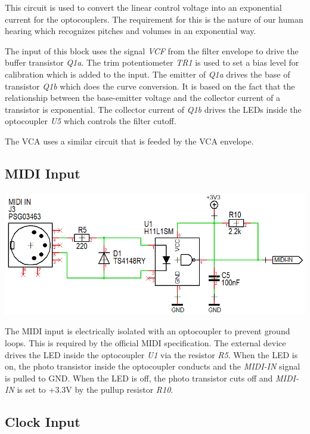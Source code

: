 \documentclass{scrartcl}
\begin{document}
This circuit is used to convert the linear control voltage into an exponential current for the optocouplers. The requirement for this is the nature of our human hearing which recognizes pitches and volumes in an exponential way.

The input of this block uses the signal \emph{VCF} from the filter envelope to drive the buffer transistor \emph{Q1a}. The trim potentiometer \emph{TR1} is used to set a bias level for calibration which is added to the input. The emitter of \emph{Q1a} drives the base of transistor \emph{Q1b} which does the curve conversion. It is based on the fact that the relationship between the base-emitter voltage and the collector current of a transistor is exponential. The collector current of \emph{Q1b} drives the LEDs inside the optocoupler \emph{U5} which controls the filter cutoff.

The VCA uses a similar circuit that is feeded by the VCA envelope.

\subsection{MIDI Input}

\begin{center}
    \includegraphics[scale=0.50]{assets/schema-midi.png}
\end{center}

The MIDI input is electrically isolated with an optocoupler to prevent ground loops. This is required by the official MIDI specification. The external device drives the LED inside the optocoupler \emph{U1} via the resistor \emph{R5}. When the LED is on, the photo transistor inside the optocoupler conducts and the \emph{MIDI-IN} signal is pulled to GND. When the LED is off, the photo transistor cuts off and \emph{MIDI-IN} is set to +3.3V by the pullup resistor \emph{R10}.

\subsection{Clock Input}
\end{document}
